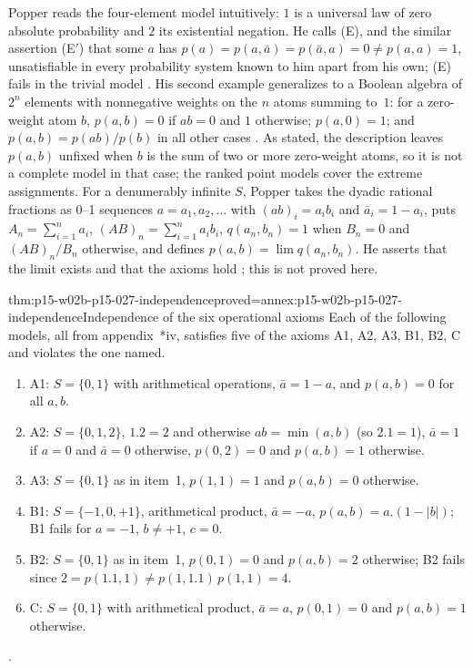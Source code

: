 Popper reads the four-element model intuitively: \(1\) is a universal law
of zero absolute probability and \(2\) its existential negation. He calls
(E), and the similar assertion (E\('\)) that some \(a\) has
\(p(a)=p(a,\bar a)=p(\bar a,a)=0\neq p(a,a)=1\), unsatisfiable in every
probability system known to him apart from his own; (E) fails in the
trivial model \parencite[appendix~*iv, p.~343]{Popper2002LogicDiscoveryUI}.
His second example generalizes to a Boolean algebra of \(2^n\) elements
with nonnegative weights on the \(n\) atoms summing to~\(1\): for a
zero-weight atom \(b\), \(p(a,b)=0\) if \(ab=0\) and \(1\) otherwise;
\(p(a,0)=1\); and \(p(a,b)=p(ab)/p(b)\) in all other cases
\parencite[appendix~*iv, p.~344]{Popper2002LogicDiscoveryUI}. As stated,
the description leaves \(p(a,b)\) unfixed when \(b\) is the sum of two or
more zero-weight atoms, so it is not a complete model in that case; the
ranked point models cover the extreme assignments. For a denumerably
infinite \(S\), Popper takes the dyadic rational fractions as 0--1
sequences \(a=a_1,a_2,\ldots\) with \((ab)_i=a_ib_i\) and
\(\bar a_i=1-a_i\), puts \(A_n=\sum_{i=1}^{n}a_i\),
\((AB)_n=\sum_{i=1}^{n}a_ib_i\), \(q(a_n,b_n)=1\) when \(B_n=0\) and
\((AB)_n/B_n\) otherwise, and defines \(p(a,b)=\lim q(a_n,b_n)\). He
asserts that the limit exists and that the axioms hold
\parencite[appendix~*iv, pp.~344--345]{Popper2002LogicDiscoveryUI}; this
is not proved here.

\begin{hbtheorem}{thm:p15-w02b-p15-027-independence}{proved=annex:p15-w02b-p15-027-independence}{Independence of the six operational axioms}
Each of the following models, all from appendix~*iv, satisfies five of
the axioms A1, A2, A3, B1, B2, C and violates the one named.
\begin{enumerate}
\item A1: \(S=\{0,1\}\) with arithmetical operations, \(\bar a=1-a\), and
  \(p(a,b)=0\) for all \(a,b\).
\item A2: \(S=\{0,1,2\}\), \(1.2=2\) and otherwise \(ab=\min(a,b)\) (so
  \(2.1=1\)), \(\bar a=1\) if \(a=0\) and \(\bar a=0\) otherwise,
  \(p(0,2)=0\) and \(p(a,b)=1\) otherwise.
\item A3: \(S=\{0,1\}\) as in item~1, \(p(1,1)=1\) and \(p(a,b)=0\)
  otherwise.
\item B1: \(S=\{-1,0,+1\}\), arithmetical product, \(\bar a=-a\),
  \(p(a,b)=a.(1-|b|)\); B1 fails for \(a=-1\), \(b\neq+1\), \(c=0\).
\item B2: \(S=\{0,1\}\) as in item~1, \(p(0,1)=0\) and \(p(a,b)=2\)
  otherwise; B2 fails since \(2=p(1.1,1)\neq p(1,1.1)\,p(1,1)=4\).
\item C: \(S=\{0,1\}\) with arithmetical product, \(\bar a=a\),
  \(p(0,1)=0\) and \(p(a,b)=1\) otherwise.
\end{enumerate}
\parencite[appendix~*iv, pp.~345--347]{Popper2002LogicDiscoveryUI}.
\end{hbtheorem}


